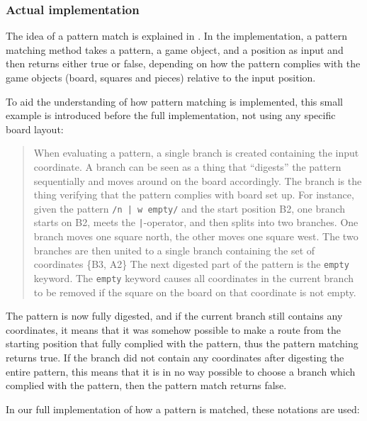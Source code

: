 \subsubsection{Actual implementation}
The idea of a pattern match is explained in . In the
implementation, a pattern matching method takes a pattern, a game object, and a
position as input and then returns either true or false, depending on how the
pattern complies with the game objects (board, squares and pieces) relative to
the input position.

To aid the understanding of how pattern matching is implemented, this
small example is introduced before the full implementation, not using
any specific board layout:

\begin{quote}
When evaluating a pattern, a single branch is created containing the input
coordinate. A branch can be seen as a thing that ``digests'' the pattern
sequentially and moves around on the board accordingly. The branch is the thing
verifying that the pattern complies with board set up. For instance, given the
pattern \texttt{/n | w empty/} and the start position B2, one branch starts on
B2, meets the \texttt{|}-operator, and then splits into two branches. One branch
moves one square north, the other moves one square west. The two branches are
then united to a single branch containing the set of coordinates \{B3, A2\} The
next digested part of the pattern is the \texttt{empty} keyword. The
\texttt{empty} keyword causes all coordinates in the current branch to be
removed if the square on the board on that coordinate is not empty.  
\end{quote}

The pattern is now fully digested, and if the current branch still contains any
coordinates, it means that it was somehow possible to make a route from the
starting position that fully complied with the pattern, thus the pattern
matching returns true. If the branch did not contain any coordinates after
digesting the entire pattern, this means that it is in no way possible to choose
a branch which complied with the pattern, then the pattern match returns false.

In our full implementation of how a pattern is matched, these notations are
used:

